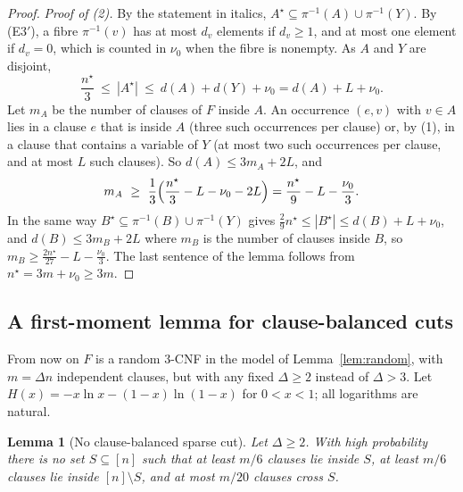 \documentclass[11pt,a4paper]{article}
\newtheorem{lemma}[theorem]{Lemma}
\theoremstyle{definition}
\theoremstyle{remark}
\begin{document}
\begin{proof}
\emph{Proof of (2).} By the statement in italics,
$A^\star\subseteq\pi^{-1}(A)\cup\pi^{-1}(Y)$. By (E3$'$), a fibre $\pi^{-1}(v)$ has at most
$d_v$ elements if $d_v\ge1$, and at most one element if $d_v=0$, which is counted in $\nu_0$
when the fibre is nonempty. As $A$ and $Y$ are disjoint,
\[
\frac{n^\star}3\ \le\ |A^\star|\ \le\ d(A)+d(Y)+\nu_0=d(A)+L+\nu_0 .
\]
Let $m_A$ be the number of clauses of $F$ inside $A$. An occurrence $(e,v)$ with $v\in A$
lies in a clause $e$ that is inside $A$ (three such occurrences per clause) or, by (1), in a
clause that contains a variable of $Y$ (at most two such occurrences per clause, and at most
$L$ such clauses). So $d(A)\le3m_A+2L$, and
\[
m_A\ \ge\ \frac13\Bigl(\frac{n^\star}3-L-\nu_0-2L\Bigr)=\frac{n^\star}9-L-\frac{\nu_0}3 .
\]
In the same way $B^\star\subseteq\pi^{-1}(B)\cup\pi^{-1}(Y)$ gives
$\frac29n^\star\le|B^\star|\le d(B)+L+\nu_0$, and $d(B)\le3m_B+2L$ where $m_B$ is the number
of clauses inside $B$, so $m_B\ge\frac{2n^\star}{27}-L-\frac{\nu_0}3$. The last sentence of
the lemma follows from $n^\star=3m+\nu_0\ge3m$.
\end{proof}

\subsection{A first-moment lemma for clause-balanced cuts}

From now on $F$ is a random 3-CNF in the model of Lemma~\ref{lem:random}, with $m=\Delta n$
independent clauses, but with any fixed $\Delta\ge2$ instead of $\Delta>3$. Let
$H(x)=-x\ln x-(1-x)\ln(1-x)$ for $0<x<1$; all logarithms are natural.

\begin{lemma}[No clause-balanced sparse cut]\label{lem:P}
Let $\Delta\ge2$. With high probability there is no set $S\subseteq[n]$ such that at least
$m/6$ clauses lie inside $S$, at least $m/6$ clauses lie inside $[n]\setminus S$, and at
most $m/20$ clauses cross $S$.
\end{lemma}
\end{document}
